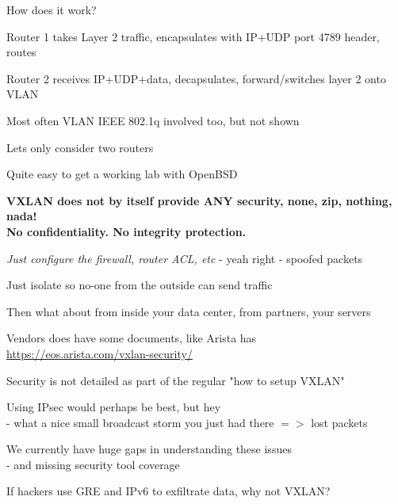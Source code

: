 \documentclass[Screen16to9,17pt,footrule]{foils}
\begin{document}


How does it work?

\begin{list2}
\item Router 1 takes Layer 2 traffic, encapsulates with IP+UDP port 4789 header, routes
\item Router 2 receives IP+UDP+data, decapsulates, forward/switches layer 2 onto VLAN
\item Most often VLAN IEEE 802.1q involved too, but not shown
\item Lets only consider two routers
\end{list2}

\centerline{Quite easy to get a working lab with OpenBSD \smiley}


{\bf VXLAN does not by itself provide ANY security, none, zip, nothing, nada! \\
No confidentiality. No integrity protection.}



\begin{list2}
\item \emph{Just configure the firewall, router ACL, etc} - yeah right - spoofed packets
\item Just isolate so no-one from the outside can send traffic
\item Then what about from inside your data center, from partners, your servers
\item Vendors does have some documents, like Arista has\\ \url{https://eos.arista.com/vxlan-security/}
\item Security is not detailed as part of the regular "how to setup VXLAN"
\item Using IPsec would perhaps be best, but hey \\
- what a nice small broadcast storm you just had there $=>$ lost packets
\end{list2}


\vskip 1cm
We currently have huge gaps in understanding these issues\\
- and missing security tool coverage

\vskip 5mm

{\small If hackers use GRE and IPv6 to exfiltrate data, why not VXLAN?}

\end{document}

